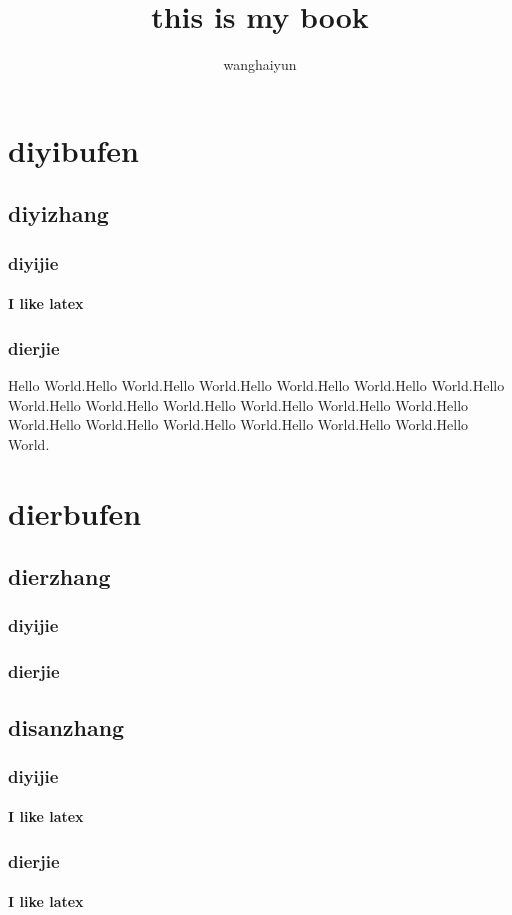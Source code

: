 \documentclass{book} %
\begin{document}
\title{this is my book}
\author{wanghaiyun}
\date{}

\maketitle

\tableofcontents
\mainmatter

\part{diyibufen}
\chapter{diyizhang}
\section{diyijie}
\subsection{I like latex}
\section{dierjie}
Hello World.Hello World.Hello World.Hello World.Hello World.Hello World.Hello World.Hello World.Hello World.Hello World.Hello World.Hello World.Hello World.Hello World.Hello World.Hello World.Hello World.Hello World.Hello World.

\part{dierbufen}
\chapter{dierzhang}
\section{diyijie}
\section{dierjie}

\chapter{disanzhang}
\section{diyijie}
\subsection{I like latex}
\section{dierjie}
\subsection{I like latex}
\end{document}
